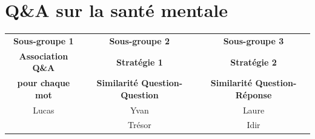 \documentclass[12pt,a4paper]{article}
\begin{document}
\pagebreak
\section{Q\&A sur la santé mentale}

\begin{center}
\begin{tabular}{c|c|c}
\toprule
\textbf{Sous-groupe 1} & \textbf{Sous-groupe 2} & \textbf{Sous-groupe 3} \\
\textbf{Association Q\&A } & \textbf{Stratégie 1} & \textbf{Stratégie 2} \\
\textbf{pour chaque mot} & \textbf{Similarité Question-Question} & \textbf{Similarité Question-Réponse}\\
\midrule
Lucas & Yvan & Laure\\
 & Trésor &  Idir\\
\bottomrule
\end{tabular}
\end{center}

\bigbreak
\end{document}
